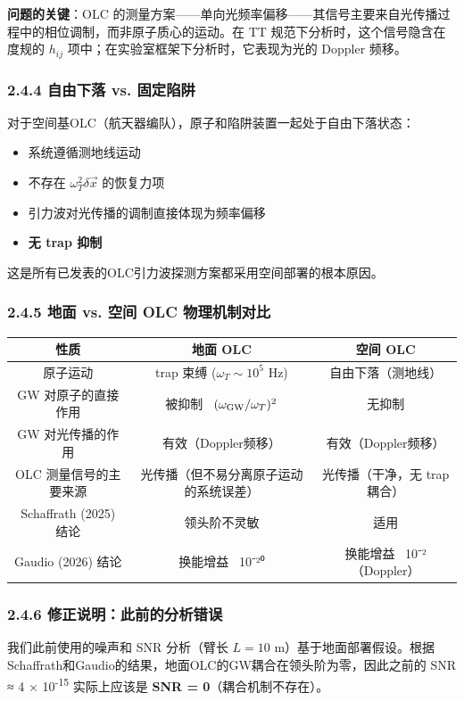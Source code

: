 \documentclass[12pt,a4paper]{article}
\begin{document}
\textbf{问题的关键}：OLC 的测量方案——单向光频率偏移——其信号主要来自光传播过程中的相位调制，而非原子质心的运动。在 TT 规范下分析时，这个信号隐含在度规的 $h_{ij}$ 项中；在实验室框架下分析时，它表现为光的 Doppler 频移。
\subsubsection{2.4.4 自由下落 vs. 固定陷阱}


对于空间基OLC（航天器编队），原子和陷阱装置一起处于自由下落状态：

\begin{itemize}
  \item 系统遵循测地线运动
  \item 不存在 $\omega_T^2 \delta \vec{x}$ 的恢复力项
  \item 引力波对光传播的调制直接体现为频率偏移
  \item \textbf{无 trap 抑制}
\end{itemize}
这是所有已发表的OLC引力波探测方案都采用空间部署的根本原因。
\subsubsection{2.4.5 地面 vs. 空间 OLC 物理机制对比}


\begin{tabular}{|c|c|c|}
\hline
性质 & 地面 OLC & 空间 OLC \\
\hline
原子运动 & trap 束缚 ($\omega_T \sim 10^5$ Hz) & 自由下落（测地线） \\
GW 对原子的直接作用 & 被抑制 ~$(\omega_{\rm GW}/\omega_T)^2$ & 无抑制 \\
GW 对光传播的作用 & 有效（Doppler频移） & 有效（Doppler频移） \\
OLC 测量信号的主要来源 & 光传播（但不易分离原子运动的系统误差） & 光传播（干净，无 trap 耦合） \\
Schaffrath (2025) 结论 & 领头阶不灵敏 & 适用 \\
Gaudio (2026) 结论 & 换能增益 ~10⁻²⁰ & 换能增益 ~10⁻²（Doppler） \\
\hline
\end{tabular}


\subsubsection{2.4.6 修正说明：此前的分析错误}


我们此前使用的噪声和 SNR 分析（臂长 $L = 10$ m）基于地面部署假设。根据Schaffrath和Gaudio的结果，地面OLC的GW耦合在领头阶为零，因此之前的 SNR ≈ 4 × 10\textsuperscript{-15} 实际上应该是 \textbf{SNR = 0}（耦合机制不存在）。
\end{document}
